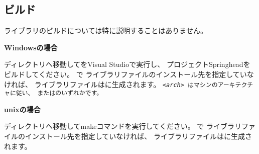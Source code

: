 \subsection{ビルド}
\label{subsec:Build}
\parindent=0pt

\noindent
ライブラリのビルドについては特に説明することはありません。

\medskip
\bf{Windowsの場合}
\begin{narrow}
	ディレクトリ\BldDir へ移動してをVisual Studioで実行し、
	プロジェクトSpringheadをビルドしてください。
	で
	ライブラリファイルのインストール先を指定していなければ、
	ライブラリファイルはに生成されます。
	\tt{<\it{arch}>} はマシンのアーキテクチャに従い、
	またはのいずれかです。
\end{narrow}

\bf{unixの場合}
\begin{narrow}
	ディレクトリ\BldDir へ移動してmakeコマンドを実行してください。
	で
	ライブラリファイルのインストール先を指定していなければ、
	ライブラリファイルはに生成されます。
\end{narrow}


